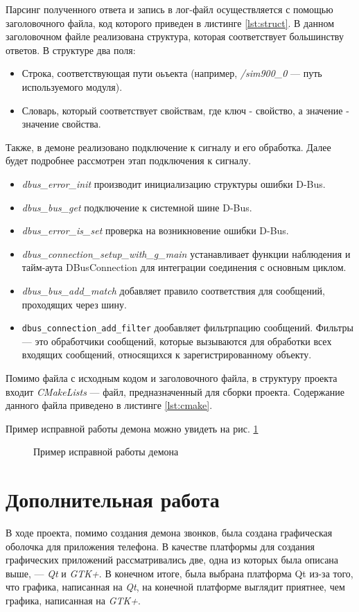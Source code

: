 Парсинг полученного ответа и запись в лог-файл осуществляется с помощью заголовочного файла, код которого приведен в листинге \ref{lst:struct}. В данном заголовочном файле реализована структура, которая соответствует большинству ответов. В структуре два поля:
\begin{itemize}
\item Строка, соответствующая пути оьъекта (например, \textit{/sim900\_0} --- путь используемого модуля).
\item Словарь, который соответствует свойствам, где ключ - свойство, а значение - значение свойства.
\end{itemize}

Также, в демоне реализовано подключение к сигналу и его обработка. Далее будет подробнее рассмотрен этап подключения к сигналу.
\begin{itemize}
\item \textit{dbus\_error\_init} производит инициализацию структуры ошибки D-Bus.
\item \textit{dbus\_bus\_get} подключение к системной шине D-Bus.
\item \textit{dbus\_error\_is\_set} проверка на возникновение ошибки D-Bus.
\item \textit{dbus\_connection\_setup\_with\_g\_main} устанавливает функции наблюдения и тайм-аута DBusConnection для интеграции соединения с основным циклом.
\item \textit{dbus\_bus\_add\_match} добавляет правило соответствия для сообщений, проходящих через шину.
\item \texttt{dbus\_connection\_add\_filter} дообавляет фильтрпацию сообщений. Фильтры --- это обработчики сообщений, которые вызываются для обработки всех входящих сообщений, относящихся к зарегистрированному объекту. 
\end{itemize}

Помимо файла с исходным кодом и заголовочного файла, в структуру проекта входит \textit{CMakeLists} --- файл, предназначенный для сборки проекта. Содержание данного файла приведено в листинге \ref{lst:cmake}.

Пример исправной работы демона можно увидеть на рис. \ref{fig:daemon}

\begin{figure}
\caption{Пример исправной работы демона}
\label{fig:daemon}
\end{figure}

\section{Дополнительная работа}
В ходе проекта, помимо создания демона звонков, была создана графическая оболочка для приложения телефона. В качестве платформы для создания графических приложений рассматривались две, одна из которых была описана выше, --- \textit{Qt} и \textit{GTK+}. В конечном итоге, была выбрана платформа Qt из-за того, что графика, написанная на \textit{Qt}, на конечной платформе выглядит приятнее, чем графика, написанная на \textit{GTK+}. 

